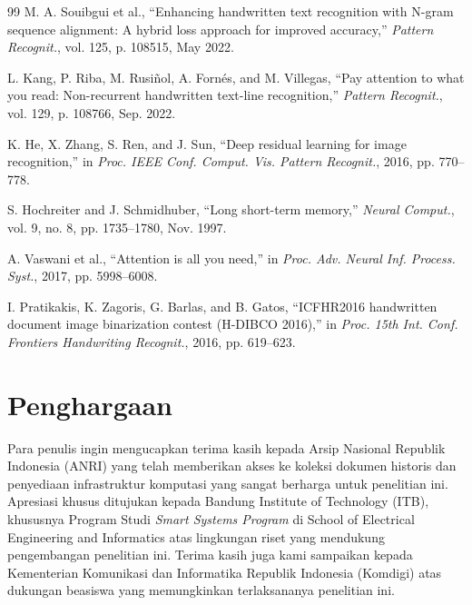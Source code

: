\documentclass[journal]{IEEEtran}
\begin{document}
\begin{thebibliography}{99}
M. A. Souibgui et al., ``Enhancing handwritten text recognition with N-gram sequence alignment: A hybrid loss approach for improved accuracy,'' \textit{Pattern Recognit.}, vol. 125, p. 108515, May 2022.

L. Kang, P. Riba, M. Rusiñol, A. Fornés, and M. Villegas, ``Pay attention to what you read: Non-recurrent handwritten text-line recognition,'' \textit{Pattern Recognit.}, vol. 129, p. 108766, Sep. 2022.

K. He, X. Zhang, S. Ren, and J. Sun, ``Deep residual learning for image recognition,'' in \textit{Proc. IEEE Conf. Comput. Vis. Pattern Recognit.}, 2016, pp. 770--778.

S. Hochreiter and J. Schmidhuber, ``Long short-term memory,'' \textit{Neural Comput.}, vol. 9, no. 8, pp. 1735--1780, Nov. 1997.

A. Vaswani et al., ``Attention is all you need,'' in \textit{Proc. Adv. Neural Inf. Process. Syst.}, 2017, pp. 5998--6008.

I. Pratikakis, K. Zagoris, G. Barlas, and B. Gatos, ``ICFHR2016 handwritten document image binarization contest (H-DIBCO 2016),'' in \textit{Proc. 15th Int. Conf. Frontiers Handwriting Recognit.}, 2016, pp. 619--623.

\end{thebibliography}

\section*{Penghargaan}

Para penulis ingin mengucapkan terima kasih kepada Arsip Nasional Republik Indonesia (ANRI) yang telah memberikan akses ke koleksi dokumen historis dan  penyediaan infrastruktur komputasi  yang sangat berharga untuk penelitian ini. Apresiasi khusus ditujukan kepada Bandung Institute of Technology (ITB), khususnya Program Studi \textit{Smart Systems Program} di School of Electrical Engineering and Informatics atas lingkungan riset yang mendukung pengembangan penelitian ini. Terima kasih juga kami sampaikan kepada Kementerian Komunikasi dan Informatika Republik Indonesia (Komdigi) atas dukungan beasiswa yang memungkinkan terlaksananya penelitian ini.
\end{document}
